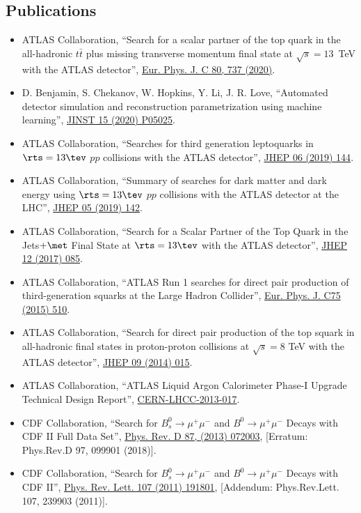 \documentclass[letter, USenglish, 11pt, subfigure]{article}
\begin{document}
\subsection{Publications}
\begin{itemize}

\item ATLAS Collaboration, ``Search for a scalar partner of the top quark in the all-hadronic $t\bar{t}$ plus missing transverse momentum final state at $\sqrt{s}=13$~TeV with the ATLAS detector'', \href{https://arxiv.org/abs/2004.14060}{Eur. Phys. J. C 80, 737 (2020)}.

\item D. Benjamin, S. Chekanov, W. Hopkins, Y. Li, J. R. Love, ``Automated detector simulation and reconstruction parametrization using machine learning'', \href{https://arxiv.org/abs/2002.11516}{JINST 15 (2020) P05025}.

\item ATLAS Collaboration, ``Searches for third generation leptoquarks in $\rts=13\tev$ $pp$ collisions with the ATLAS detector'', \href{https://arxiv.org/abs/1902.08103}{JHEP 06 (2019) 144}.
  
\item ATLAS Collaboration, ``Summary of searches for dark matter and dark energy using $\rts=13\tev$ $pp$ collisions with the ATLAS detector at the LHC'', \href{https://arxiv.org/abs/1903.01400}{JHEP 05 (2019) 142}.

\item ATLAS Collaboration, ``Search for a Scalar Partner of the Top Quark in the Jets$+ \met$ Final State at $\rts=13\tev$ with the ATLAS detector'', \href{https://arxiv.org/abs/1709.04183}{JHEP 12 (2017) 085}.

\item ATLAS Collaboration, ``ATLAS Run 1 searches for direct pair production of third-generation squarks at the Large Hadron Collider'', \href{http://arxiv.org/abs/1506.08616}{Eur. Phys. J. C75 (2015) 510}.

\item ATLAS Collaboration, ``Search for direct pair production of the top squark in all-hadronic final states in proton-proton collisions at $\sqrt{s}=8$ TeV with the ATLAS detector'', \href{http://arxiv.org/abs/1406.1122}{JHEP 09 (2014) 015}.

\item ATLAS Collaboration, ``ATLAS Liquid Argon Calorimeter Phase-I Upgrade Technical Design Report'', \href{https://cds.cern.ch/record/1602230}{CERN-LHCC-2013-017}.

\item CDF Collaboration, ``Search for $B_s^0\to\mu^+\mu^-$ and $B^0\to\mu^+\mu^-$ Decays with CDF II Full Data Set'', \href{http://arxiv.org/abs/1301.7048}{Phys. Rev. D 87, (2013) 072003}, [Erratum: Phys.Rev.D 97, 099901 (2018)].

\item CDF Collaboration, ``Search for $B_s^0\to\mu^+\mu^-$ and $B^0\to\mu^+\mu^-$ Decays with CDF II'', \href{https://arxiv.org/abs/1107.2304}{Phys. Rev. Lett. 107 (2011) 191801}, [Addendum: Phys.Rev.Lett. 107, 239903 (2011)].

\end{itemize}
\end{document}

